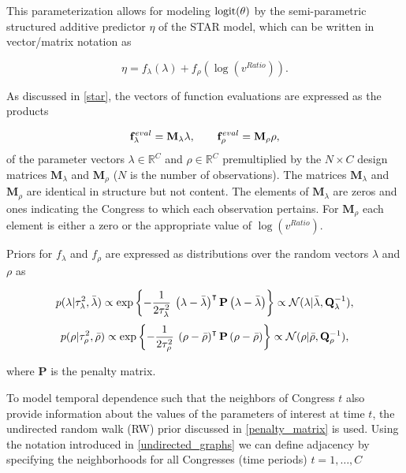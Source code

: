 This parameterization allows for modeling ${\rm logit}(\theta)$ by the semi-parametric structured 
additive predictor $\eta$ of the STAR model, which can be written in vector/matrix notation 
as 

\begin{equation*}
 \eta = f_\lambda(\lambda) +  f_\rho(\log{(v^{Ratio})}). 
\end{equation*}

\noindent As discussed in \ref{star}, the vectors of function evaluations are expressed as the products 

\begin{equation*}
\mathbf{f}^{eval}_\lambda = \mathbf{M}_\lambda \lambda, 
\qquad 
\mathbf{f}^{eval}_\rho =  \mathbf{M}_\rho \rho, 
\end{equation*}
%
\noindent of the parameter vectors $\lambda \in \mathbb{R}^C$ and $\rho \in \mathbb{R}^C$ 
premultiplied by the $N \times C$ design matrices  $\mathbf{M}_\lambda$ and  $\mathbf{M}_\rho$ 
($N$ is the number of observations). The matrices $\mathbf{M}_\lambda$ and $\mathbf{M}_\rho$ 
are identical in structure but not content. The elements of $\mathbf{M}_\lambda$ are zeros and ones 
indicating the Congress to which each observation pertains. For $\mathbf{M}_\rho$ each element is 
either a zero or the appropriate value of $\log{(v^{Ratio})}$. 


Priors for $f_{\lambda}$ and $f_{\rho}$ are expressed as distributions over the random 
vectors $\lambda$ and $\rho$ as 

\begin{equation*}
p(\lambda | \tau_\lambda^2, \bar{\lambda}) \propto \exp{\left\{-\frac{1}{2\tau_\lambda^2} \: \left(\lambda - \bar{\lambda}\right)^\intercal  \mathbf{P}   \left(\lambda - \bar{\lambda}\right) \right\}} \propto \mathcal{N} (\lambda | \bar{\lambda}, \mathbf{Q}_\lambda^{-1}), 
\end{equation*}
\begin{equation*}
p(\rho | \tau_\rho^2, \bar{\rho}) \propto \exp{\left\{-\frac{1}{2\tau_\rho^2} \: \left(\rho - \bar{\rho}\right)^\intercal  \mathbf{P} \left(\rho-\bar{\rho}\right) \right\}} \propto \mathcal{N} (\rho | \bar{\rho}, \mathbf{Q}_\rho^{-1}), 
\end{equation*}

\noindent where $\mathbf{P}$ is the penalty matrix.

To model temporal dependence such that the neighbors of Congress $t$ also provide information
about the values of the parameters of interest at time $t$, the undirected random walk (RW) 
prior discussed in \ref{penalty_matrix} is used. Using the notation introduced in \ref{undirected_graphs} 
we can define adjacency by specifying the neighborhoods for all Congresses (time periods) 
$t = 1, \dots, C$

